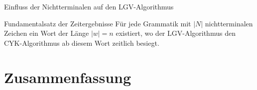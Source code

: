 \documentclass{beamer}
\begin{document}
	\begin{frame}{Einfluss der Nichtterminalen auf den LGV-Algorithmus}
		\begin{block}{Fundamentalsatz der Zeitergebnisse}
			Für jede Grammatik mit $|N|$ nichtterminalen Zeichen ein Wort der Länge $|w| = n$ existiert, wo der LGV-Algorithmus den CYK-Algorithmus ab diesem Wort zeitlich besiegt.
		\end{block}
	\end{frame}
	
	

	
	\section{Zusammenfassung}
\end{document}
